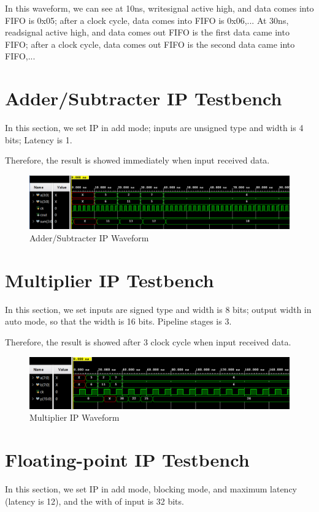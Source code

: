 \documentclass[a4paper, 12pt]{report}
\begin{document}
In this waveform, we can see at 10ns, writesignal active high, and data comes into FIFO is 0x05; after a clock cycle, data comes into FIFO is 0x06,... At 30ns, readsignal active high, and data comes out FIFO is the first data came into FIFO; after a clock cycle, data comes out FIFO is the second data came into FIFO,...

\section{Adder/Subtracter IP Testbench}
In this section, we set IP in add mode; inputs are unsigned type and width is 4 bits; Latency is 1. 

Therefore, the result is showed immediately when input received data.
\begin{figure}[H]
    \centering
    \includegraphics[width = 16cm]{picture/result/add/waveformADD.png}
    \caption{Adder/Subtracter IP Waveform}
    \medskip
\end{figure}

\section{Multiplier IP Testbench}
In this section, we set inputs are signed type and width is 8 bits; output width in auto mode, so that the width is 16 bits. Pipeline stages is 3.

Therefore, the result is showed after 3 clock cycle when input received data.

\begin{figure}[H]
    \centering
    \includegraphics[width = 16cm]{picture/result/mul/waveformMUL.png}
    \caption{Multiplier IP Waveform}
    \medskip
\end{figure}

\section{Floating-point IP Testbench}
In this section, we set IP in add mode, blocking mode, and maximum latency (latency is 12), and the with of input is 32 bits.\\
\end{document}
